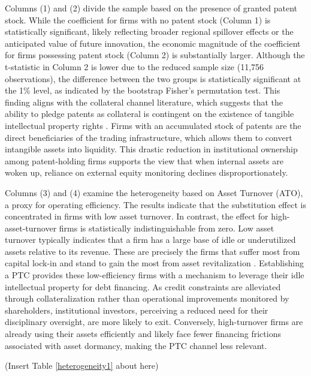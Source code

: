 \documentclass[12pt,a4paper]{article}
\begin{document}
Columns (1) and (2) divide the sample based on the presence of granted patent stock. While the coefficient for firms with no patent stock (Column 1) is statistically significant, likely reflecting broader regional spillover effects or the anticipated value of future innovation, the economic magnitude of the coefficient for firms possessing patent stock (Column 2) is substantially larger. Although the t-statistic in Column 2 is lower due to the reduced sample size (11,756 observations), the difference between the two groups is statistically significant at the 1\% level, as indicated by the bootstrap Fisher’s permutation test. This finding aligns with the collateral channel literature, which suggests that the ability to pledge patents as collateral is contingent on the existence of tangible intellectual property rights \citep{mann2018creditor}. Firms with an accumulated stock of patents are the direct beneficiaries of the trading infrastructure, which allows them to convert intangible assets into liquidity. This drastic reduction in institutional ownership among patent-holding firms supports the view that when internal assets are woken up, reliance on external equity monitoring declines disproportionately.

Columns (3) and (4) examine the heterogeneity based on Asset Turnover (ATO), a proxy for operating efficiency. The results indicate that the substitution effect is concentrated in firms with low asset turnover. In contrast, the effect for high-asset-turnover firms is statistically indistinguishable from zero. Low asset turnover typically indicates that a firm has a large base of idle or underutilized assets relative to its revenue. These are precisely the firms that suffer most from capital lock-in and stand to gain the most from asset revitalization \citep{campello2013real}. Establishing a PTC provides these low-efficiency firms with a mechanism to leverage their idle intellectual property for debt financing. As credit constraints are alleviated through collateralization rather than operational improvements monitored by shareholders, institutional investors, perceiving a reduced need for their disciplinary oversight, are more likely to exit. Conversely, high-turnover firms are already using their assets efficiently and likely face fewer financing frictions associated with asset dormancy, making the PTC channel less relevant.

\begin{center}
    (Insert Table \ref{heterogeneity1} about here)
\end{center}
\end{document}
